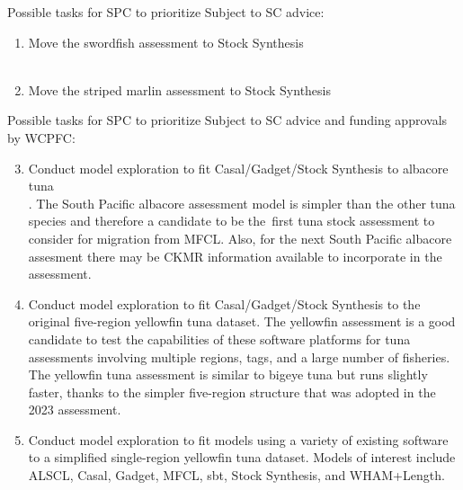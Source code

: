 \documentclass[aspectratio=169,fleqn]{beamer}
\begin{document}

\begin{frame}{Possible tasks for SPC to prioritize}
  Subject to SC advice:\\[4ex]
  \begin{enumerate}
    \item Move the {\green swordfish} assessment to Stock Synthesis\\
    \\[3ex]
    \item Move the {\green striped marlin} assessment to Stock Synthesis\\
  \end{enumerate}
\end{frame}


\begin{frame}{Possible tasks for SPC to prioritize}
  Subject to SC advice and funding approvals by WCPFC:\\[4ex]
  \begin{enumerate}\setcounter{enumi}{2}
  \item Conduct model exploration to fit Casal/Gadget/Stock Synthesis to
  albacore tuna\\
  . The South Pacific albacore assessment model is simpler than the
  other tuna species and therefore a candidate to be the~first tuna stock
  assessment to consider for migration from MFCL. Also, for the next South
  Pacific albacore assesment there may be CKMR information available to
  incorporate in the assessment.
  \item Conduct model exploration to fit Casal/Gadget/Stock Synthesis to the
  original five-region yellowfin tuna dataset. The yellowfin assessment is a
  good candidate to test the capabilities of these software platforms for tuna
  assessments involving multiple regions, tags, and a large number of fisheries.
  The yellowfin tuna assessment is similar to bigeye tuna but runs slightly
  faster, thanks to the simpler \mbox{five-region} structure that was adopted in
  the 2023 assessment.
  \item Conduct model exploration to fit models using a variety of existing
  software to a simplified single-region yellowfin tuna dataset. Models of
  interest include ALSCL, Casal, Gadget, MFCL, sbt, Stock Synthesis, and
  WHAM+Length.
  \end{enumerate}
\end{frame}
\end{document}

